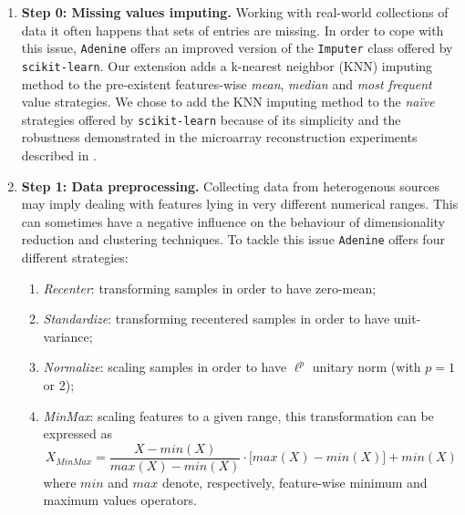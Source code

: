 \documentclass[twoside,11pt]{article}
\makeatletter
\newcommand{\ade}{\texttt{Adenine}\@\xspace}
\makeatother
\begin{document}
\begin{enumerate}
  \item[]{\bf Step 0: Missing values imputing.}
  Working with real-world collections of data it often happens that sets of entries are missing. In order to cope with this issue, \ade offers an improved version of the \texttt{Imputer} class offered by \texttt{scikit-learn}. Our extension adds a k-nearest neighbor (KNN) imputing method to the pre-existent features-wise \emph{mean}, \emph{median} and \emph{most frequent} value strategies.
  We chose to add the KNN imputing method to the \emph{na\"ive} strategies offered by \texttt{scikit-learn} because of its simplicity and the robustness demonstrated in the microarray reconstruction experiments described in \citep{troyanskaya2001missing}.

  \item[]{\bf Step 1: Data preprocessing.}
  Collecting data from heterogenous sources may imply dealing with features lying in very different numerical ranges. This can sometimes have a negative influence on the behaviour of dimensionality reduction and clustering techniques. To tackle this issue \ade offers four different strategies:
  \begin{enumerate}[label=(\roman*)]
    \item \emph{Recenter}: transforming samples in order to have zero-mean;
    \item \emph{Standardize}: transforming recentered samples in order to have unit-variance;
    \item \emph{Normalize}: scaling samples in order to have $\ell^p$ unitary norm (with $p = 1$ or $2$);
    \item \emph{MinMax}: scaling features to a given range, this transformation can be expressed as
    \[
      X_{MinMax} = \frac{X - min(X)}{max(X) - min(X)} \cdot \Big[max(X) - min(X)\Big] + min(X)
    \]
    where $min$ and $max$ denote, respectively, feature-wise minimum and maximum values operators.
  \end{enumerate}


\end{enumerate}
\end{document}
